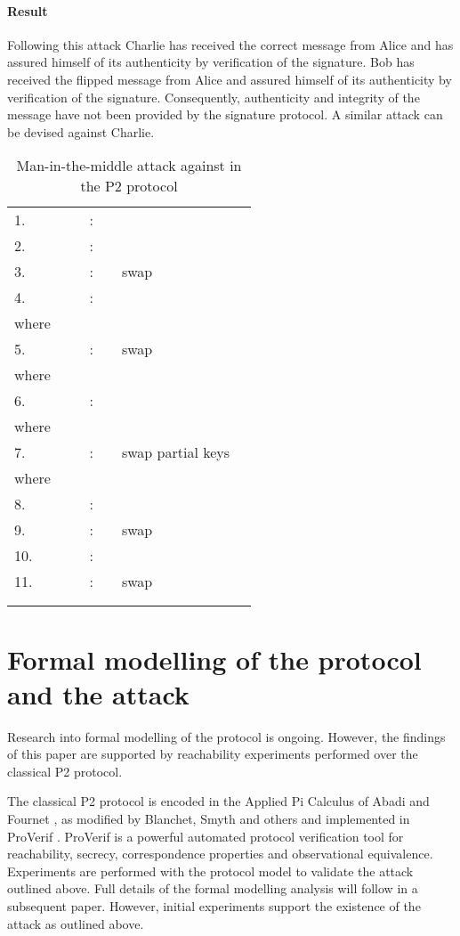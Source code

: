 \documentclass[english]{article}
\providecommand{\tabularnewline}{\\}
\begin{document}
\paragraph{Result}

Following this attack Charlie has received the correct message 
from Alice and has assured himself of its authenticity by verification
of the signature. Bob has received the flipped message  from
Alice and assured himself of its authenticity by verification of the
signature. Consequently, authenticity and integrity of the message
have not been provided by the signature protocol. A similar attack
can be devised against Charlie.

\begin{table}
\begin{tabular}{llllllll}
1. &  &  &  & : &  &  & \tabularnewline
2. &  &  &  & : &  &  & \tabularnewline
3. &  &  &  & : &  & swap  & \tabularnewline
4. &  &  &  & : &  &  & \tabularnewline
\multicolumn{7}{l}{where } & \tabularnewline
5. &  &  &  & : &  & swap  & \tabularnewline
\multicolumn{7}{l}{where } & \tabularnewline
6. &  &  &  & : &  &  & \tabularnewline
\multicolumn{7}{l}{where } & \tabularnewline
7. &  &  &  & : &  & swap partial keys & \tabularnewline
\multicolumn{7}{l}{where } & \tabularnewline
8. &  &  &  & : &  &  & \tabularnewline
9. &  &  &  & : &  & swap  & \tabularnewline
10. &  &  &  & : &  &  & \tabularnewline
11. &  &  &  & : &  & swap  & \tabularnewline
 &  &  &  &  &  &  & \tabularnewline
 &  &  &  &  &  &  & \tabularnewline
\end{tabular}

\caption{\label{tab:Man-in-the-middle-attack-against}Man-in-the-middle attack
against  in the P2 protocol}


\end{table}



\section{Formal modelling of the protocol and the attack}

Research into formal modelling of the protocol is ongoing. However,
the findings of this paper are supported by reachability experiments
performed over the classical P2 protocol.

The classical P2 protocol is encoded in the Applied Pi Calculus of
Abadi and Fournet \cite{Abadi2001}, as modified by Blanchet, Smyth
and others and implemented in ProVerif \cite{Blanchet2015}. ProVerif
is a powerful automated protocol verification tool for reachability,
secrecy, correspondence properties and observational equivalence.
Experiments are performed with the protocol model to validate the
attack outlined above. Full details of the formal modelling analysis
will follow in a subsequent paper. However, initial experiments support
the existence of the attack as outlined above. 
\end{document}
